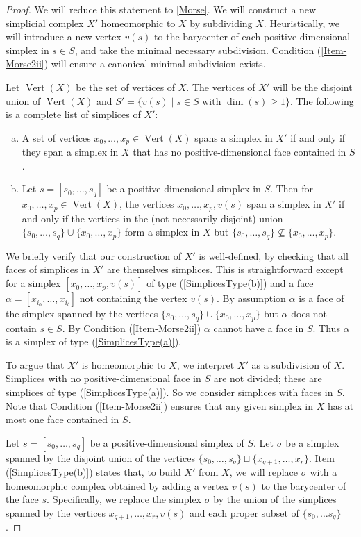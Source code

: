 \documentclass[a4paper]{amsart}
\numberwithin{theoremcounter}{section}
\theoremstyle{definition}
\theoremstyle{remark}
\DeclareMathOperator{\V}{Vert}
\begin{document}
\begin{proof} We will reduce this statement to \autoref{Morse}. We will construct a new simplicial complex $X'$ homeomorphic to $X$ by subdividing $X$. Heuristically, we will introduce a new vertex $v(s)$ to the barycenter of each positive-dimensional simplex in $s \in S$, and take the minimal necessary subdivision. Condition (\ref{Item-Morse2ii}) will ensure a canonical minimal subdivision exists. 

Let $\V(X)$ be the set of vertices of $X$. The vertices of $X'$ will be the disjoint union of $\V(X)$ and $S' = \{ v(s)  \mid  s \in S \text{ with } \dim(s)\geq 1\}$.  The following is a complete list of simplices of $X'$: 
\begin{enumerate}[(a)]
\item \label{SimplicesType(a)} A set of vertices $x_0, \dots, x_p \in \V(X)$ spans a simplex in $X'$ if and only if they span a simplex in $X$ that has no positive-dimensional face contained in $S$.
\item \label{SimplicesType(b)} Let $s =[s_0, \dots, s_q]$ be a positive-dimensional simplex in $S$. Then for  $x_0, \dots, x_p \in \V(X)$, the vertices $x_0, \dots, x_p, v(s)$ span a simplex in $X'$ if and only if the vertices in the (not necessarily disjoint) union  $\{s_0, \dots, s_q\} \cup \{x_0, \dots, x_p \}$ form a simplex in $X$ but $\{s_0, \dots, s_q\} \not\subseteq \{x_0, \dots, x_p \}$. 
\end{enumerate} 
We briefly verify that our construction of $X'$ is well-defined, by checking that all faces of simplices in $X'$ are themselves simplices. This is straightforward except for a simplex $[x_0, \dots, x_p, v(s)]$ of type (\ref{SimplicesType(b)}) and a face $\alpha=[x_{i_0}, \dots, x_{i_t}]$ not containing the vertex $v(s)$. By assumption $\alpha$ is a face of the simplex spanned by the vertices $\{s_0, \dots, s_q\} \cup \{x_0, \dots, x_p \}$ but $\alpha$ does not contain $s \in S$. By Condition (\ref{Item-Morse2ii}) $\alpha$ cannot have a face in $S$. Thus $\alpha$ is a simplex of type (\ref{SimplicesType(a)}). 

To argue that $X'$ is homeomorphic to $X$, we interpret $X'$ as a subdivision of $X$. Simplices with no positive-dimensional face in $S$ are not divided; these are simplices of type (\ref{SimplicesType(a)}).  So we consider simplices with faces in $S$. Note that Condition (\ref{Item-Morse2ii}) ensures that any given simplex in $X$ has at most one face contained in $S$. 

 Let $s =[s_0, \dots, s_q]$ be a positive-dimensional simplex of $S$. Let $\sigma$  be a simplex spanned by the disjoint union of the vertices $\{s_0, \dots, s_q\} \sqcup \{x_{q+1}, \dots, x_r \}$.  Item (\ref{SimplicesType(b)})  states that, to build $X'$ from $X$, we will replace $\sigma$ with a homeomorphic complex obtained by adding a vertex $v(s)$ to the barycenter of the face $s$. Specifically, we replace  the simplex $\sigma$ by the union of the simplices spanned by the vertices $x_{q+1}, \dots, x_r, v(s)$ and each proper subset of $\{s_0, \dots s_q\}$. 
 

\end{proof}
\end{document}
